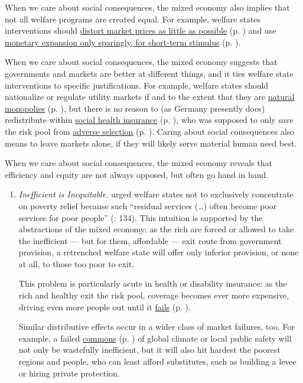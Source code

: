 \begin{enumerate}
	When we care about social consequences, the mixed economy also implies that not all welfare programs are created equal. For example, welfare states interventions should \hyperref[sec:minimal_DWL]{distort market prices as little as possible} (p. \pageref{sec:minimal_DWL}) and use \hyperref[sec:price_stability]{monetary expansion only sparingly, for short-term stimulus} (p. \pageref{sec:price_stability}).
	
	When we care about social consequences, the mixed economy suggests that  governments and markets are better at different things, and it ties welfare state interventions to specific justifications. For example, welfare states should nationalize or regulate utility markets if and to the extent that they are \hyperref[sec:natural_monopoly]{natural monopolies} (p. \pageref{sec:natural_monopoly}), but there is no reason to (as Germany presently does) redistribute within \hyperref[sec:state_insurance]{social health insurance} (p. \pageref{sec:state_insurance}), who was supposed to only save the risk pool from \hyperref[sec:adverse_selection]{adverse selection} (p. \pageref{sec:adverse_selection}). Caring about social consequences also means to leave markets alone, if they will likely serve material human need best.
	
	When we care about social consequences, the mixed economy reveals that efficiency and equity are not always opposed, but often go hand in hand. 
	\begin{enumerate}
		\item \emph{Inefficient is Inequitable.} \citeauthor{Titmuss1974} urged welfare states not to exclusively concentrate on poverty relief because such ``residual services (\ldots) often become poor services for poor people'' (\citeyear{Titmuss1974}: 134). This intuition is supported by the abstractions of the mixed economy: as the rich are forced or allowed to take the inefficient --- but for them, affordable --- exit route from government provision, a retrenched welfare state will offer only inferior provision, or none at all, to those too poor to exit. 
		
		This problem is particularly acute in health or disability insurance: as the rich and healthy exit the risk pool, coverage becomes ever more expensive, driving even more people out until it \hyperref[sec:adverse_selection]{fails} (p. \pageref{sec:adverse_selection}). 
		
		Similar distributive effects occur in a wider class of market failures, too. For example, a failed \hyperref[sec:common_good]{commons} (p. \pageref{sec:common_good}) of global climate or local public safety will not only be wastefully inefficient, but it will also hit hardest the poorest regions and people, who can least afford substitutes, such as building a levee or hiring private protection. 
		

\end{enumerate}
\end{enumerate}
